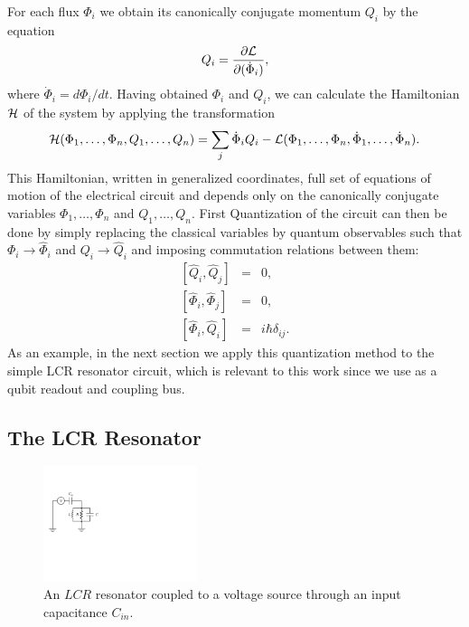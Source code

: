 %
For each flux $\Phi_i$ we obtain its canonically conjugate momentum $Q_i$ by the equation
%
\begin{equation}
Q_i = \frac{\partial \begin{mathcal}L\end{mathcal}}{\partial(\dot{\Phi}_i)}, \label{eq:canonical_momentum}
\end{equation}
%
where $\dot{\Phi}_i=d\Phi_i/dt$. Having obtained $\Phi_i$ and $Q_i$, we can calculate the Hamiltonian $\begin{mathcal}H\end{mathcal}$ of the system by applying the transformation
%
\begin{equation}
\begin{mathcal}H\end{mathcal}(\Phi_1,\hdots,\Phi_n,Q_1,\hdots,Q_n) = \sum\limits_j \dot{\Phi}_i Q_i - \begin{mathcal}L\end{mathcal}(\Phi_1,\hdots,\Phi_n,\dot{\Phi}_1,\hdots,\dot{\Phi}_n). \label{eq:l_to_h}
\end{equation}
%
This Hamiltonian, written in generalized coordinates, full set of equations of motion of the electrical circuit and depends only on the canonically conjugate variables $\Phi_{1},\hdots,\Phi_n$ and $Q_1,\hdots,Q_n$. First Quantization of the circuit can then be done by simply replacing the classical variables by quantum observables such that $\Phi_i\to\hat{\Phi}_i$ and $Q_i\to\hat{Q}_i$ and imposing commutation relations between them:
%
\begin{eqnarray}
\left[\hat{Q}_i,\hat{Q}_j\right] & = & 0, \\
\left[\hat{\Phi}_i,\hat{\Phi}_j \right] & = & 0, \\
\left[\hat{\Phi}_i,\hat{Q}_i\right] & = & i\hbar\delta_{ij}. \label{eq:quantization_commutation_relations}
\end{eqnarray}
%
As an example, in the next section we apply this quantization method to the simple LCR resonator circuit, which is relevant to this work since we use as a qubit readout and coupling bus.

\subsection{The LCR Resonator}

\begin{figure}
	\centering
	\includegraphics[width=0.4\textwidth]{"./material/figures/introduction/lcr_resonator"}
	\caption[]{An $LCR$ resonator coupled to a voltage source through an input capacitance $C_{in}$.}
	\label{fig:lcr_resonator}
\end{figure}

